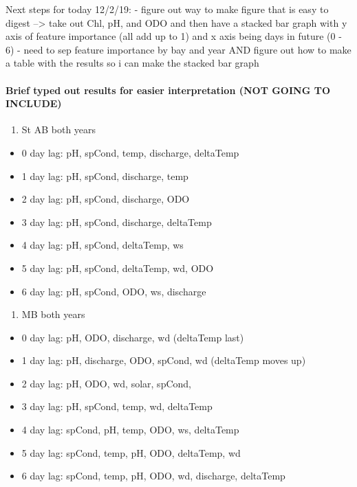 \documentclass[]{article}
\providecommand{\tightlist}{%
  \setlength{\itemsep}{0pt}\setlength{\parskip}{0pt}}
\let\oldparagraph\paragraph
\renewcommand{\paragraph}[1]{\oldparagraph{#1}\mbox{}}
\begin{document}
Next steps for today 12/2/19: - figure out way to make figure that is
easy to digest --\textgreater{} take out Chl, pH, and ODO and then have
a stacked bar graph with y axis of feature importance (all add up to 1)
and x axis being days in future (0 - 6) - need to sep feature importance
by bay and year AND figure out how to make a table with the results so i
can make the stacked bar graph

\hypertarget{brief-typed-out-results-for-easier-interpretation-not-going-to-include}{%
\paragraph{Brief typed out results for easier interpretation (NOT GOING
TO
INCLUDE)}\label{brief-typed-out-results-for-easier-interpretation-not-going-to-include}}

\begin{enumerate}
\def\labelenumi{\arabic{enumi})}
\tightlist
\item
  St AB both years
\end{enumerate}

\begin{itemize}
\tightlist
\item
  0 day lag: pH, spCond, temp, discharge, deltaTemp
\item
  1 day lag: pH, spCond, discharge, temp
\item
  2 day lag: pH, spCond, discharge, ODO
\item
  3 day lag: pH, spCond, discharge, deltaTemp
\item
  4 day lag: pH, spCond, deltaTemp, ws
\item
  5 day lag: pH, spCond, deltaTemp, wd, ODO
\item
  6 day lag: pH, spCond, ODO, ws, discharge
\end{itemize}

\begin{enumerate}
\def\labelenumi{\arabic{enumi})}
\setcounter{enumi}{1}
\tightlist
\item
  MB both years
\end{enumerate}

\begin{itemize}
\tightlist
\item
  0 day lag: pH, ODO, discharge, wd (deltaTemp last)
\item
  1 day lag: pH, discharge, ODO, spCond, wd (deltaTemp moves up)
\item
  2 day lag: pH, ODO, wd, solar, spCond,
\item
  3 day lag: pH, spCond, temp, wd, deltaTemp
\item
  4 day lag: spCond, pH, temp, ODO, ws, deltaTemp
\item
  5 day lag: spCond, temp, pH, ODO, deltaTemp, wd
\item
  6 day lag: spCond, temp, pH, ODO, wd, discharge, deltaTemp
\end{itemize}
\end{document}
